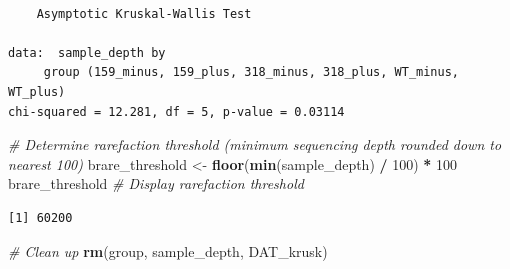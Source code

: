 \documentclass[
  11pt,
]{article}
\newenvironment{Shaded}{\begin{snugshade}}{\end{snugshade}}
\newcommand{\AttributeTok}[1]{\textcolor[rgb]{0.13,0.29,0.53}{#1}}
\newcommand{\CommentTok}[1]{\textcolor[rgb]{0.56,0.35,0.01}{\textit{#1}}}
\newcommand{\DecValTok}[1]{\textcolor[rgb]{0.00,0.00,0.81}{#1}}
\newcommand{\FunctionTok}[1]{\textcolor[rgb]{0.13,0.29,0.53}{\textbf{#1}}}
\newcommand{\NormalTok}[1]{#1}
\newcommand{\OtherTok}[1]{\textcolor[rgb]{0.56,0.35,0.01}{#1}}
\newcommand{\SpecialCharTok}[1]{\textcolor[rgb]{0.81,0.36,0.00}{\textbf{#1}}}
\newcommand{\StringTok}[1]{\textcolor[rgb]{0.31,0.60,0.02}{#1}}
\begin{document}
\begin{Shaded}
\end{Shaded}

\begin{verbatim}

    Asymptotic Kruskal-Wallis Test

data:  sample_depth by
     group (159_minus, 159_plus, 318_minus, 318_plus, WT_minus, WT_plus)
chi-squared = 12.281, df = 5, p-value = 0.03114
\end{verbatim}

\begin{Shaded}
\begin{Highlighting}[]
\CommentTok{\# Determine rarefaction threshold (minimum sequencing depth rounded down to nearest 100)}
\NormalTok{brare\_threshold }\OtherTok{\textless{}{-}} \FunctionTok{floor}\NormalTok{(}\FunctionTok{min}\NormalTok{(sample\_depth) }\SpecialCharTok{/} \DecValTok{100}\NormalTok{) }\SpecialCharTok{*} \DecValTok{100}
\NormalTok{brare\_threshold  }\CommentTok{\# Display rarefaction threshold}
\end{Highlighting}
\end{Shaded}

\begin{verbatim}
[1] 60200
\end{verbatim}

\begin{Shaded}
\begin{Highlighting}[]
\CommentTok{\# Clean up}
\FunctionTok{rm}\NormalTok{(group, sample\_depth, DAT\_krusk)}
\end{Highlighting}
\end{Shaded}
\end{document}
